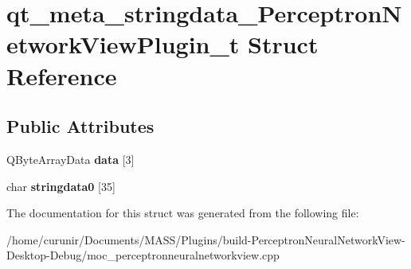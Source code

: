 \hypertarget{structqt__meta__stringdata___perceptron_network_view_plugin__t}{}\section{qt\+\_\+meta\+\_\+stringdata\+\_\+\+Perceptron\+Network\+View\+Plugin\+\_\+t Struct Reference}
\label{structqt__meta__stringdata___perceptron_network_view_plugin__t}
\subsection*{Public Attributes}
\begin{DoxyCompactItemize}
\item 
Q\+Byte\+Array\+Data {\bfseries data} \mbox{[}3\mbox{]}\hypertarget{structqt__meta__stringdata___perceptron_network_view_plugin__t_ac9e615feee49ee12d4084eaefa6869d7}{}\label{structqt__meta__stringdata___perceptron_network_view_plugin__t_ac9e615feee49ee12d4084eaefa6869d7}

\item 
char {\bfseries stringdata0} \mbox{[}35\mbox{]}\hypertarget{structqt__meta__stringdata___perceptron_network_view_plugin__t_a96d0f54196f7c429eefa665f63d23e6b}{}\label{structqt__meta__stringdata___perceptron_network_view_plugin__t_a96d0f54196f7c429eefa665f63d23e6b}

\end{DoxyCompactItemize}


The documentation for this struct was generated from the following file\+:\begin{DoxyCompactItemize}
\item 
/home/curunir/\+Documents/\+M\+A\+S\+S/\+Plugins/build-\/\+Perceptron\+Neural\+Network\+View-\/\+Desktop-\/\+Debug/moc\+\_\+perceptronneuralnetworkview.\+cpp\end{DoxyCompactItemize}
